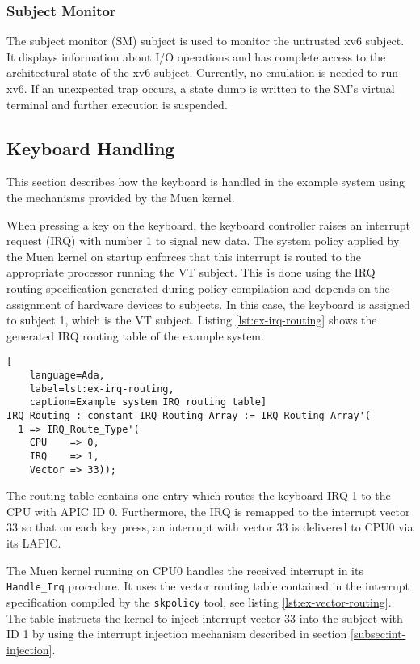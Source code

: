 \subsubsection{Subject Monitor}
The subject monitor (SM) subject is used to monitor the untrusted xv6
subject. It displays information about I/O operations and has complete access to
the architectural state of the xv6 subject. Currently, no emulation is needed to
run xv6. If an unexpected trap occurs, a state dump is written to the SM's
virtual terminal and further execution is suspended.

\subsection{Keyboard Handling}\label{subsec:keyboard-handling}
This section describes how the keyboard is handled in the example system using
the mechanisms provided by the Muen kernel.

When pressing a key on the keyboard, the keyboard controller raises an interrupt
request (IRQ) with number 1 to signal new data. The system policy
applied by the Muen kernel on startup enforces that this interrupt is routed to
the appropriate processor running the VT subject. This is done using the IRQ
routing specification generated during policy compilation and depends on the
assignment of hardware devices to subjects. In this case, the keyboard is
assigned to subject 1, which is the VT subject. Listing \ref{lst:ex-irq-routing}
shows the generated IRQ routing table of the example system.

\begin{lstlisting}[
	language=Ada,
	label=lst:ex-irq-routing,
	caption=Example system IRQ routing table]
IRQ_Routing : constant IRQ_Routing_Array := IRQ_Routing_Array'(
  1 => IRQ_Route_Type'(
    CPU    => 0,
    IRQ    => 1,
    Vector => 33));
\end{lstlisting}

The routing table contains one entry which routes the keyboard IRQ 1 to the CPU
with APIC ID 0. Furthermore, the IRQ is remapped to the interrupt vector 33 so
that on each key press, an interrupt with vector 33 is delivered to CPU0 via its
LAPIC.

The Muen kernel running on CPU0 handles the received interrupt in its
\texttt{Handle\_Irq} procedure. It uses the vector routing table contained in
the interrupt specification compiled by the \texttt{skpolicy} tool, see listing
\ref{lst:ex-vector-routing}. The table instructs the kernel to inject interrupt
vector 33 into the subject with ID 1 by using the interrupt injection mechanism
described in section \ref{subsec:int-injection}.

